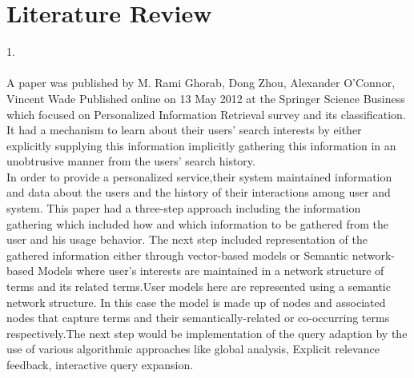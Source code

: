 \newpage
\chapter{Literature Review}

1.\\ \\ A paper was published by M. Rami Ghorab, Dong Zhou,
Alexander O’Connor, Vincent Wade Published online on 13
May 2012 at the Springer Science Business which focused on
Personalized Information Retrieval survey and its
classification. It had a mechanism to learn about their
users’ search interests by either explicitly supplying this
information implicitly gathering this information in an
unobtrusive manner from the users’ search history.\\ In order to
provide a personalized service,their system maintained
information and data about the users and the history of their
interactions among user and system. This paper had a three-step
approach including the information gathering which included
how and which information to be gathered from the user and
his usage behavior. The next step included representation of
the gathered information either through vector-based models
or Semantic network-based Models where user’s interests are
maintained in a network structure of terms and its related
terms.User models here are represented using a semantic
network structure. In this case the model is made up of nodes
and associated nodes that capture terms and their
semantically-related or co-occurring terms respectively.The
next step would be implementation of the query adaption by
the use of various algorithmic approaches like global analysis,
Explicit relevance feedback, interactive query expansion.\\

